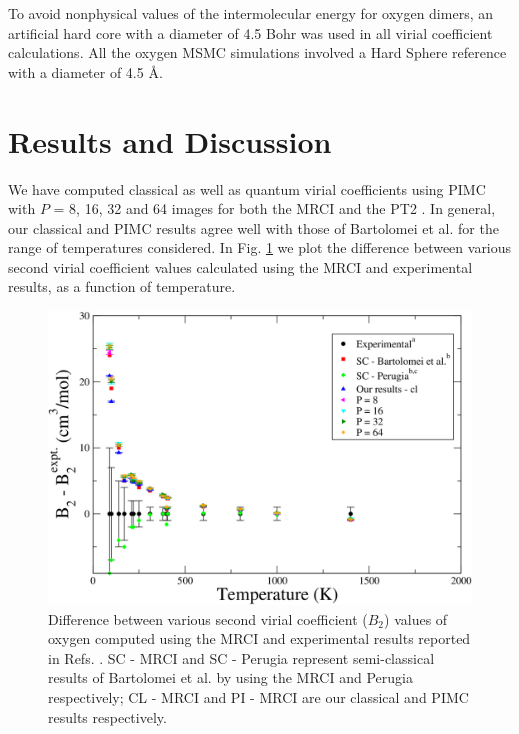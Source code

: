     To avoid nonphysical values of the intermolecular energy for oxygen dimers, an artificial hard core with a diameter of 4.5 Bohr was used in all virial coefficient calculations. All the oxygen MSMC simulations involved a Hard Sphere reference with a diameter of 4.5 \AA.
\section{Results and Discussion}
    We have computed classical as well as quantum virial coefficients using PIMC with $P$ = 8, 16, 32 and 64 images for both the MRCI and the PT2 \PESs{}. In general, our classical and PIMC results agree well with those of Bartolomei et al. \cite{Bartolomei2010} for the range of temperatures considered. In Fig. \ref{fig:B2O2AllExpDiffMRCI} we plot the difference between various second virial coefficient values calculated using the MRCI \PESs{} and experimental results, as a function of temperature.
    \begin{figure}[!htbp]
        \centering
        \includegraphics[scale=0.20,keepaspectratio]{Chapter-6/Figures/B2O2AllExpDiffMRCI.png}
        \caption{Difference between various second virial coefficient ($B_2$) values of oxygen computed using the MRCI \PESs{} and experimental results reported in Refs. \cite{Bartolomei2010,Dymond}. SC - MRCI and SC - Perugia represent semi-classical results of Bartolomei et al. \cite{Bartolomei2010} by using the MRCI and Perugia \PESs{} \cite{Aquilanti1999} respectively; CL - MRCI and PI - MRCI are our classical and PIMC results respectively.}
        \label{fig:B2O2AllExpDiffMRCI}
    \end{figure}

